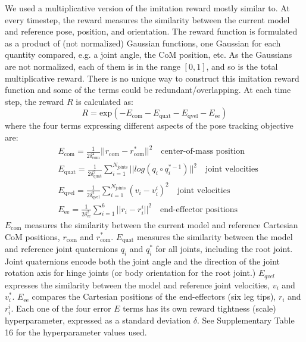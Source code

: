 \documentclass[sn-mathphys-num]{sn-jnl}%
\theoremstyle{thmstyleone}%
\theoremstyle{thmstyletwo}%
\theoremstyle{thmstylethree}%
\begin{document}
\begin{appendices}
We used a multiplicative version of the imitation reward mostly similar to\cite{peng2018deepmimic,merel2020catch}. 
At every timestep, the reward measures the similarity between the current model and reference pose, position, and orientation. 
The reward function is formulated as a product of (not normalized) Gaussian functions, one Gaussian for each quantity compared, e.g. a joint angle, the CoM position, etc. 
As the Gaussians are not normalized, each of them is in the range $ [0, 1] $, and so is the total multiplicative reward. 
There is no unique way to construct this imitation reward function and some of the terms could be redundant/overlapping. At each time step, the reward $ R $ is calculated as:
\begin{equation}
	R = \text{exp} (
		- E_\text{com}
		- E_\text{quat}
		- E_\text{qvel}
		- E_\text{ee}
	)
\end{equation}
where the four terms expressing different aspects of the pose tracking objective are:
\begin{equation}\label{key}
	\begin{aligned}
		& E_\text{com} = \frac{1}{2 \delta_\text{com}^2} 
			|| r_\text{com} - r_\text{com}^{*} ||^2  \quad 
			\text{center-of-mass position} \\
		& E_\text{quat} = \frac{1}{2 \delta_\text{quat}^2} 
			\sum_{i=1}^{N_\text{joints}} || log(q_i \circ q_i^{*-1}) ||^2  \quad
			\text{joint velocities} \\
		& E_\text{qvel} = \frac{1}{2 \delta_\text{qvel}^2} 
			\sum_{i=1}^{N_\text{joints}}
			(v_i - v_i^{i})^2  \quad
			\text{joint velocities} \\
		& E_\text{ee} = 
			\frac{1}{2 \delta_\text{ee}^2}
			\sum_{i=1}^{6}
			|| r_i - r_i^{i} ||^2  \quad
			\text{end-effector positions}
	\end{aligned}
\end{equation}
$ E_\text{com} $ measures the similarity between the current model and reference Cartesian CoM positions, $ r_\text{com} $ and $ r_\text{com}^{*} $. 
$ E_\text{quat} $ measures the similarity between the model and reference joint quaternions $ q_i $ and $ q_i^{*} $ for all joints, including the root joint. 
Joint quaternions encode both the joint angle and the direction of the joint rotation axis for hinge joints (or body orientation for the root joint.) 
$ E_{qvel} $ expresses the similarity between the model and reference joint velocities, $ v_i $ and $ v_i^{*} $. 
$ E_\text{ee} $ compares the Cartesian positions of the end-effectors (six leg tips), $ r_i $ and $ r_i^{i} $. 
Each one of the four error $ E $ terms has its own reward tightness (scale) hyperparameter, expressed as a standard deviation $ \delta $. 
See Supplementary Table 16 for the hyperparameter values used.



\end{appendices}
\end{document}
